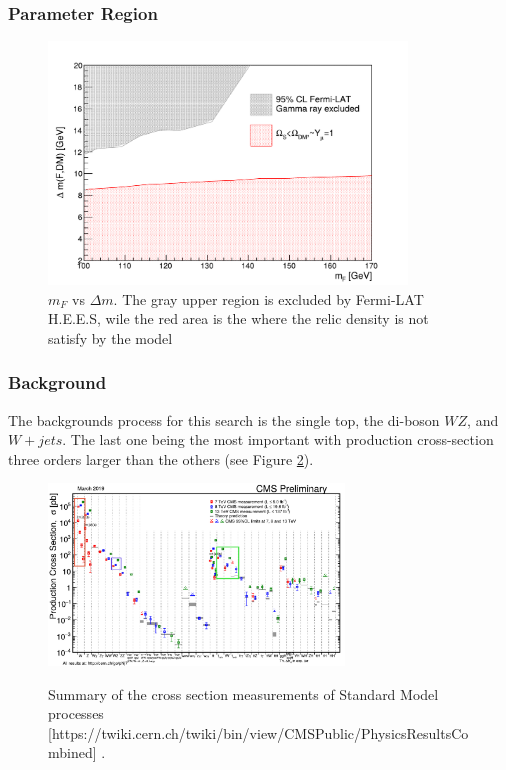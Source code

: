 \documentclass{beamer}
\begin{document}
\begin{frame}
\frametitle{Parameter Region}

\begin{figure}[!tbp]
\centering
\includegraphics[width=0.85\textwidth]{pictures/LimitPlotsTesis}%
\caption{{\scriptsize $m_F$ vs $\Delta m$. The gray upper region is excluded by Fermi-LAT H.E.E.S, wile the red area is the where the relic density is not satisfy by the model}}
\label{fig7}
\end{figure}


\end{frame}
\begin{frame}
\frametitle{Background}
\begin{justify}
The backgrounds process for this search is the single top, the di-boson $WZ$, and $W+jets $. The last one being the most important with production cross-section three orders larger than the others (see Figure \ref{XSSummary}).

\end{justify}

\begin{figure}[!tbp]
\centering
\includegraphics[width=0.7\textwidth]{pictures/CrossSectionSMProcesses}\label{fig8}
\caption{{\scriptsize Summary of the cross section measurements of Standard Model processes [{\tiny https://twiki.cern.ch/twiki/bin/view/CMSPublic/PhysicsResultsCombined}]    }.}
\label{XSSummary}
\end{figure}

\end{frame}
\end{document}
